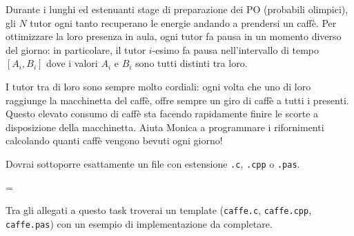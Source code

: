 \usepackage{xcolor}
\usepackage{afterpage}
\usepackage{pifont,mdframed}
\usepackage[bottom]{footmisc}

\makeatletter
\gdef\this@inputfilename{input.txt}
\gdef\this@outputfilename{output.txt}
\makeatother

\newcommand{\inputfile}{\texttt{input.txt}}
\newcommand{\outputfile}{\texttt{output.txt}}

\newenvironment{warning}
  {\par\begin{mdframed}[linewidth=2pt,linecolor=gray]%
    \begin{list}{}{\leftmargin=1cm
                   \labelwidth=\leftmargin}\item[\Large\ding{43}]}
  {\end{list}\end{mdframed}\par}

	Durante i lunghi ed estenuanti stage di preparazione dei PO (probabili olimpici), gli $N$ tutor ogni tanto recuperano le energie andando a prendersi un caff\`e. Per ottimizzare la loro presenza in aula, ogni tutor fa pausa in un momento diverso del giorno: in particolare, il tutor $i$-esimo fa pausa nell'intervallo di tempo $[A_i, B_i]$ dove i valori $A_i$ e $B_i$ sono tutti distinti tra loro.

	I tutor tra di loro sono sempre molto cordiali: ogni volta che uno di loro raggiunge la macchinetta del caff\`e, offre sempre un giro di caff\`e a tutti i presenti. Questo elevato consumo di caff\`e sta facendo rapidamente finire le scorte a disposizione della macchinetta. Aiuta Monica a programmare i rifornimenti calcolando quanti caff\`e vengono bevuti ogni giorno!

\Implementation
Dovrai sottoporre esattamente un file con estensione \texttt{.c}, \texttt{.cpp} o \texttt{.pas}.

\begin{warning}
Tra gli allegati a questo task troverai un template (\texttt{caffe.c}, \texttt{caffe.cpp}, \texttt{caffe.pas}) con un esempio di implementazione da completare.
\end{warning}

